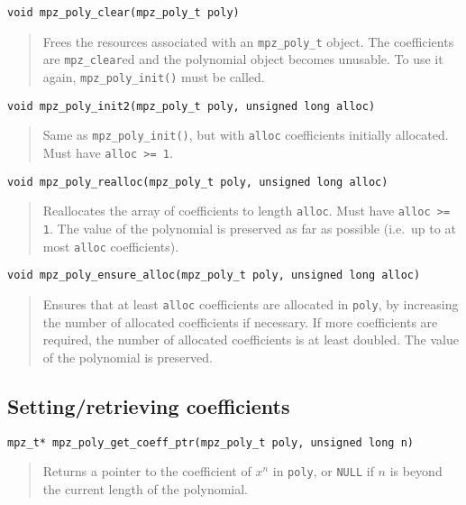 \documentclass[a4paper,10pt]{article}
\newcommand{\code}{\lstinline}
\begin{document}
\begin{lstlisting}
void mpz_poly_clear(mpz_poly_t poly)
\end{lstlisting}
\begin{quote}
Frees the resources associated with an \code{mpz_poly_t} object. The coefficients are \code{mpz_clear}ed and the polynomial object becomes unusable. To use it again, \code{mpz_poly_init()} must be called.
\end{quote}

\begin{lstlisting}
void mpz_poly_init2(mpz_poly_t poly, unsigned long alloc)
\end{lstlisting}
\begin{quote}
Same as \code{mpz_poly_init()}, but with \code{alloc} coefficients initially allocated. Must have \code{alloc >= 1}.
\end{quote}

\begin{lstlisting}
void mpz_poly_realloc(mpz_poly_t poly, unsigned long alloc)
\end{lstlisting}
\begin{quote}
Reallocates the array of coefficients to length \code{alloc}. Must have \code{alloc >= 1}. The value of the polynomial is preserved as far as possible (i.e.~up to at most \code{alloc} coefficients).
\end{quote}

\begin{lstlisting}
void mpz_poly_ensure_alloc(mpz_poly_t poly, unsigned long alloc)
\end{lstlisting}
\begin{quote}
Ensures that at least \code{alloc} coefficients are allocated in \code{poly}, by increasing the number of allocated coefficients if necessary. If more coefficients are required, the number of allocated coefficients is at least doubled. The value of the polynomial is preserved.
\end{quote}



\subsection{Setting/retrieving coefficients}

\begin{lstlisting}
mpz_t* mpz_poly_get_coeff_ptr(mpz_poly_t poly, unsigned long n)
\end{lstlisting}
\begin{quote}
Returns a pointer to the coefficient of $x^n$ in \code{poly}, or \code{NULL} if $n$ is beyond the current length of the polynomial.
\end{quote}
\end{document}
